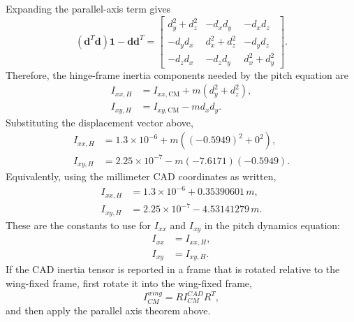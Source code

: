 \documentclass{article}
\begin{document}
Expanding the parallel-axis term gives
\begin{equation}
(\mathbf{d}^T \mathbf{d})\mathbf{1} - \mathbf{d}\mathbf{d}^T
=
\begin{bmatrix}
d_y^2 + d_z^2 & -d_xd_y & -d_xd_z \\
-d_yd_x & d_x^2 + d_z^2 & -d_yd_z \\
-d_zd_x & -d_zd_y & d_x^2 + d_y^2
\end{bmatrix}.
\end{equation}
Therefore, the hinge-frame inertia components needed by the pitch equation are
\begin{align}
I_{xx,H}
&=
I_{xx,\mathrm{CM}} + m(d_y^2 + d_z^2), \\
I_{xy,H}
&=
I_{xy,\mathrm{CM}} - m d_x d_y.
\end{align}
Substituting the displacement vector above,
\begin{align}
I_{xx,H}
&=
1.3 \times 10^{-6}
+ m\left((-0.5949)^2 + 0^2\right), \\
I_{xy,H}
&=
2.25 \times 10^{-7}
- m(-7.6171)(-0.5949).
\end{align}
Equivalently, using the millimeter CAD coordinates as written,
\begin{align}
I_{xx,H}
&=
1.3 \times 10^{-6}
+ 0.35390601\,m, \\
I_{xy,H}
&=
2.25 \times 10^{-7}
- 4.53141279\,m.
\end{align}
These are the constants to use for \(I_{xx}\) and \(I_{xy}\) in the pitch dynamics equation:
\begin{align}
I_{xx} &= I_{xx,H}, \\
I_{xy} &= I_{xy,H}.
\end{align}
If the CAD inertia tensor is reported in a frame that is rotated relative to the wing-fixed frame, first rotate it into the wing-fixed frame,
\begin{equation}
I_{CM}^{wing}
=
R I_{CM}^{CAD} R^T,
\end{equation}
and then apply the parallel axis theorem above.
\end{document}
